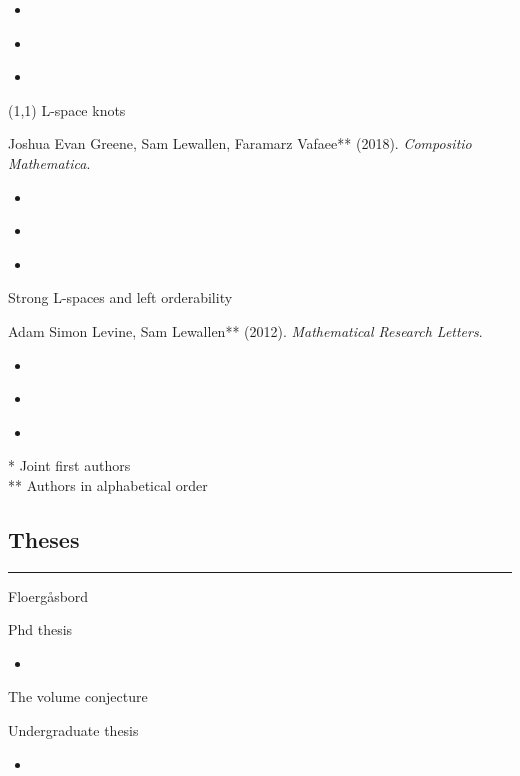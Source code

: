 \documentclass[11pt]{article}
\def\tightlist{}
\begin{document}
\begin{itemize}
\tightlist
\item
  \href{https://arxiv.org/abs/0902.2037}{\emph{}}
\item
  \href{https://www.mitpressjournals.org/doi/abs/10.1162/neco.2009.07-08-830}{\emph{}}
\item
  \href{/pdf/Burak_et_al_2009_Stimulus-dependent_correlations_in_threshold-crossing.pdf}{\emph{}}
\end{itemize}

(1,1) L-space knots

Joshua Evan Greene, Sam Lewallen, Faramarz Vafaee** (2018).
\emph{Compositio Mathematica}.

\begin{itemize}
\tightlist
\item
  \href{https://arxiv.org/abs/1610.04810}{\emph{}}
\item
  \href{https://www.cambridge.org/core/journals/compositio-mathematica/article/11-lspace-knots/913FE639D9C8D4BDDFBC6F23AD9A7488\#}{\emph{}}
\item
  \href{/pdf/Greene_et_al_2018_$(1,1)$_L-space_knots.pdf}{\emph{}}
\end{itemize}

Strong L-spaces and left orderability

Adam Simon Levine, Sam Lewallen** (2012). \emph{Mathematical Research
Letters}.

\begin{itemize}
\tightlist
\item
  \href{https://arxiv.org/abs/1110.0563}{\emph{}}
\item
  \href{https://www.intlpress.com/site/pub/pages/journals/items/mrl/content/vols/0019/0006/a005/}{\emph{}}
\item
  \href{/pdf/Levine_Lewallen_2012_Strong_L-spaces_and_left-orderability.pdf}{\emph{}}
\end{itemize}

* Joint first authors\\
** Authors in alphabetical order

\subsection{Theses}\label{theses}

\begin{center}\rule{0.5\linewidth}{\linethickness}\end{center}

\hypertarget{publications}{}
Floergåsbord

Phd thesis

\begin{itemize}
\tightlist
\item
  \href{/pdf/Floergasbord.pdf}{\emph{}}
\end{itemize}

The volume conjecture

Undergraduate thesis

\begin{itemize}
\tightlist
\item
  \href{/pdf/volume_conjecture.pdf}{\emph{}}
\end{itemize}
\end{document}
